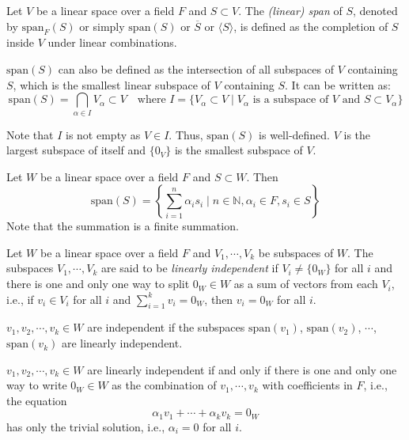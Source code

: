 \documentclass[
	11pt, %
	fleqn, %
	a4paper, %
]{LegrandOrangeBook}
\renewcommand{\span}[1]{\text{span}(#1)} %
\renewcommand{\bar}[1]{\overline{#1}} %
\begin{document}
\begin{definition}
    Let $V$ be a linear space over a field $F$ and $S \subset V$. The \emph{(linear) span} of $S$, denoted by $\text{span}_F (S)$ or simply $\span S$ or $\bar{S}$ or $\langle S \rangle$, is defined as the completion of $S$ inside $V$ under linear combinations.
\end{definition}

\begin{corollary}
    $\span S$ can also be defined as the intersection of all subspaces of $V$ containing $S$, which is the smallest linear subspace of $V$ containing $S$. It can be written as:
    \[
        \span S = \bigcap_{\alpha \in I} V_{\alpha} \subset V \quad \text{where } I = \{ V_{\alpha} \subset V \mid V_{\alpha} \text{ is a subspace of } V \text{ and } S \subset V_{\alpha} \}
    \]
\end{corollary}

\begin{remark}
    Note that $I$ is not empty as $V \in I$. Thus, $\span S$ is well-defined. $V$ is the largest subspace of itself and $\{0_V\}$ is the smallest subspace of $V$.
\end{remark}

\begin{proposition}
    Let $W$ be a linear space over a field $F$ and $S \subset W$. Then 
    \[
        \span S = \left\{ \sum_{i=1}^{n} \alpha_i s_i \mid n \in \mathbb{N}, \alpha_i \in F, s_i \in S \right\}
    \]
    Note that the summation is a finite summation.
\end{proposition}

\begin{definition}
    Let $W$ be a linear space over a field $F$ and $V_1, \cdots, V_k$ be subspaces of $W$. The subspaces $V_1, \cdots, V_k$ are said to be \emph{linearly independent} if $V_i \neq \{0_W\}$ for all $i$ and there is one and only one way to split $0_W \in W$ as a sum of vectors from each $V_i$, i.e., if $v_i \in V_i$ for all $i$ and $\sum_{i=1}^{k} v_i = 0_W$, then $v_i = 0_W$ for all $i$.
\end{definition}

\begin{proposition}
    $v_1, v_2, \cdots, v_k \in W$ are independent if the subspaces $\span{v_1}$, $\span{v_2}$, $\cdots$, $\span{v_k}$ are linearly independent.
\end{proposition}

\begin{proposition}
    $v_1, v_2, \cdots, v_k \in W$ are linearly independent if and only if there is one and only one way to write $0_W \in W$ as the combination of $v_1, \cdots, v_k$ with coefficients in $F$, i.e., the equation 
    \[
        \alpha_1 v_1 + \cdots + \alpha_k v_k = 0_W
    \]
    has only  the trivial solution, i.e., $\alpha_i = 0$ for all $i$.
\end{proposition}
\end{document}
